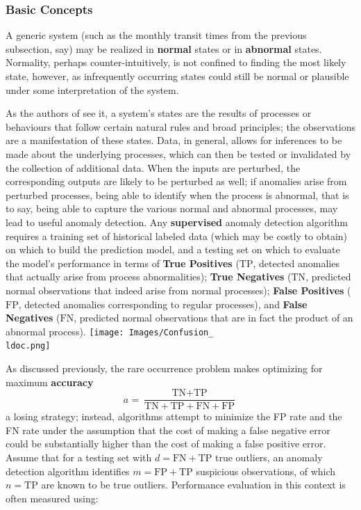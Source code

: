 \subsubsection*{Basic Concepts}
A generic system (such as the monthly transit times from the previous subsection, say) may be realized in \textbf{normal} states or in \textbf{abnormal} states. Normality, perhaps counter-intuitively, is not confined to finding the most likely state, however, as infrequently occurring states could still be normal or plausible under some interpretation of the system. \par As the authors of \cite{A10} see it, a system's states are the results of processes or behaviours that follow certain natural rules and broad principles; the observations are a manifestation of these states. Data, in general, allows for inferences to be made about the underlying processes, which can then be tested or invalidated by the collection of additional data. When the inputs are perturbed, the corresponding outputs are likely to be perturbed as well; if anomalies arise from perturbed processes, being able to identify when the process is abnormal, that is to say, being able to capture the various normal and abnormal processes, may lead to useful anomaly detection. 
\newl Any \textbf{supervised} anomaly detection algorithm requires a training set of historical labeled data (which may be costly to obtain) on which to build the prediction model, and a testing set on which to evaluate the model's performance in terms of \textbf{True Positives} ($\text{TP}$, detected anomalies that actually arise from process abnormalities); 
\textbf{True Negatives} ($\text{TN}$, predicted normal observations that indeed arise from normal processes); \textbf{False Positives} ($\text{FP}$, detected anomalies corresponding to regular processes), and \textbf{False Negatives} ($\text{FN}$, predicted normal observations that are in fact the product of an abnormal process). \newpage\noindent
\qquad\texttt{[image: Images/Confusion\_\\ldoc.png]}\par\noindent
As discussed previously, the rare occurrence problem makes optimizing for maximum \textbf{accuracy} $$a=\frac{\text{TN}+\text{TP}}{\text{TN}+\text{TP}+\text{FN}+\text{FP}}$$ a losing strategy; instead, algorithms attempt to minimize the FP rate and the FN rate under the assumption that the cost of making a false negative error could be substantially higher than the cost of making a false positive error. \newpage \noindent Assume that for a testing set with $d=\text{FN}+\text{TP}$ true outliers, an anomaly detection algorithm identifies $m=\text{FP}+\text{TP}$ suspicious observations, of which $n=\text{TP}$ are known to be true outliers. Performance evaluation in this context is often measured using: 

